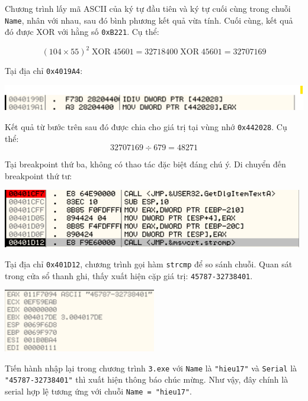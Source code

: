 Chương trình lấy mã ASCII của ký tự đầu tiên và ký tự cuối cùng trong chuỗi \texttt{Name}, nhân với nhau, sau đó bình phương kết quả vừa tính. Cuối cùng, kết quả đó được XOR với hằng số \texttt{0xB221}. Cụ thể:

\[
(104 \times 55)^2 \;\mathrm{XOR}\; 45601 = 32718400 \;\mathrm{XOR}\; 45601 = 32707169
\]

Tại địa chỉ \texttt{0x4019A4}:

\begin{center}
    \includegraphics[width=\textwidth]{img/file-3/7.png}
\end{center}

Kết quả từ bước trên sau đó được chia cho giá trị tại vùng nhớ \texttt{0x442028}. Cụ thể: 
\[
    32707169 \div 679 = 48271
\] 

Tại breakpoint thứ ba, không có thao tác đặc biệt đáng chú ý. Di chuyển đến breakpoint thứ tư:

\begin{center}
    \includegraphics[width=\textwidth]{img/file-3/8.png}
\end{center}

Tại địa chỉ \texttt{0x401D12}, chương trình gọi hàm \texttt{strcmp} để so sánh chuỗi. Quan sát trong cửa sổ thanh ghi, thấy xuất hiện cặp giá trị: \texttt{45787-32738401}.

\begin{center}
    \includegraphics[width=0.5\textwidth]{img/file-3/9.png}
\end{center}

Tiến hành nhập lại trong chương trình \texttt{3.exe} với \texttt{Name} là \texttt{"hieu17"} và \texttt{Serial} là \texttt{"45787-32738401"} thì xuất hiện thông báo chúc mừng. Như vậy, đây chính là serial hợp lệ tương ứng với chuỗi \texttt{Name = "hieu17"}.

